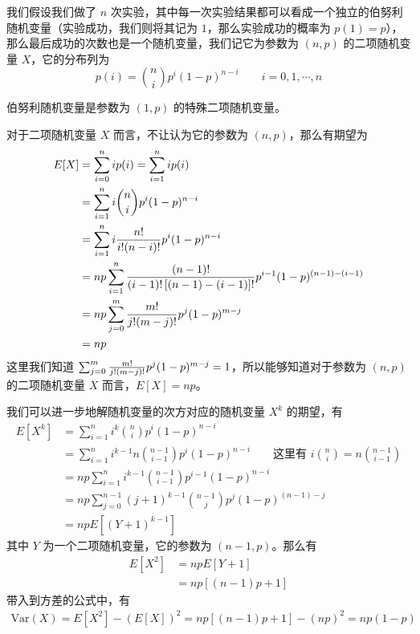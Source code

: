 \documentclass[utf8,a4paper,nofonts,9pt]{ctexbook}
\begin{document}
我们假设我们做了 $n$ 次实验，其中每一次实验结果都可以看成一个独立的伯努利随机变量（实验成功，我们则将其记为 $1$，那么实验成功的概率为 $p(1) = p$），那么最后成功的次数也是一个随机变量，我们记它为参数为 $(n, p)$ 的二项随机变量 $X$，它的分布列为
\[
    p(i) = {n \choose i} p^i (1 - p)^{n - i} \qquad i = 0, 1, \cdots, n
\]

伯努利随机变量是参数为 $(1, p)$ 的特殊二项随机变量。

对于二项随机变量 $X$ 而言，不让认为它的参数为 $(n, p)$，那么有期望为
\begin{align*}
    E[X] & = \sum_{i = 0}^{n} i p(i) = \sum_{i = 1}^{n} i p(i) \\
         & = \sum_{i = 1}^{n} i {n \choose i} p^i (1 - p)^{n - i} \\
         & = \sum_{i = 1}^{n} i {n! \over i! (n - i)!} p^i (1 - p)^{n - i} \\
         & = np \sum_{i = 1}^{n} {(n - 1)! \over (i - 1)! \left[(n - 1) - (i - 1)\right]!} p^{i - 1} (1 - p)^{(n - 1) - (i - 1)} \\
         & = np \sum_{j = 0}^{m} {m! \over j! (m - j)!} p^j (1 - p)^{m - j} \\
         & = np
\end{align*}
这里我们知道 $\sum_{j = 0}^{m} {m! \over j! (m - j)!} p^j (1 - p)^{m - j} = 1$，所以能够知道对于参数为 $(n, p)$ 的二项随机变量 $X$ 而言，$E[X] = np$。

我们可以进一步地解随机变量的次方对应的随机变量 $X^k$ 的期望，有
\begin{align*}
    E[X^k] & = \sum_{i = 1}^{n} i^k {n \choose i} p^i (1 - p)^{n - i} \\
           & = \sum_{i = 1}^{n} i^{k - 1} n {n - 1 \choose i - 1} p^i (1 - p)^{n - i} \qquad \textrm{这里有 $i {n \choose i} = n {n - 1 \choose i - 1}$} \\
           & = np \sum_{i = 1}^{n} i^{k - 1} {n - 1 \choose i - 1} p^{i - 1} (1 - p)^{n - i} \\
           & = np \sum_{j = 0}^{n - 1} (j + 1)^{k - 1} {n - 1 \choose j} p^j (1 - p)^{(n - 1) - j} \\
           & = np E[(Y + 1)^{k - 1}]
\end{align*}
其中 $Y$ 为一个二项随机变量，它的参数为 $(n - 1, p)$。那么有
\begin{align*}
    E[X^2] & = np E[Y + 1] \\
           & = np [(n - 1)p + 1]
\end{align*}
带入到方差的公式中，有
\begin{align*}
    \textrm{Var}(X) = E[X^2] - (E[X])^2 = np [(n - 1)p + 1] - (np)^2 = np (1 - p)
\end{align*}
\end{document}
